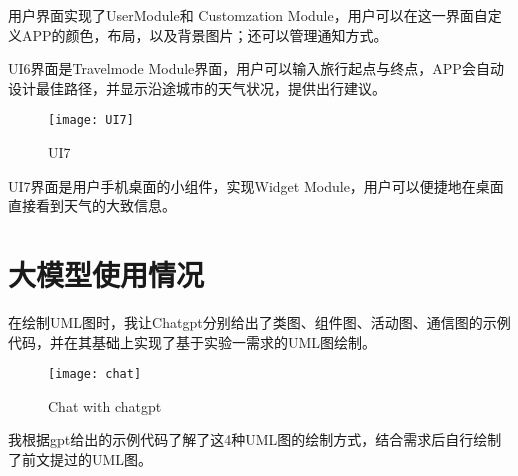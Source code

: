 \documentclass[UTF8]{ctexart}
\begin{document}
用户界面实现了UserModule和 Customzation Module，用户可以在这一界面自定义APP的颜色，布局，以及背景图片；还可以管理通知方式。

UI6界面是Travelmode Module界面，用户可以输入旅行起点与终点，APP会自动设计最佳路径，并显示沿途城市的天气状况，提供出行建议。
\newpage
\begin{figure}[htbp]
\centering
\texttt{[image: UI7]}
\caption{UI7}
\label{figure}
\end{figure}

UI7界面是用户手机桌面的小组件，实现Widget Module，用户可以便捷地在桌面直接看到天气的大致信息。

\section{大模型使用情况}

在绘制UML图时，我让Chatgpt分别给出了类图、组件图、活动图、通信图的示例代码，并在其基础上实现了基于实验一需求的UML图绘制。
\begin{figure}[htbp]
\centering
\texttt{[image: chat]}
\caption{Chat with chatgpt}
\label{figure}
\end{figure}

我根据gpt给出的示例代码了解了这4种UML图的绘制方式，结合需求后自行绘制了前文提过的UML图。
\end{document}
